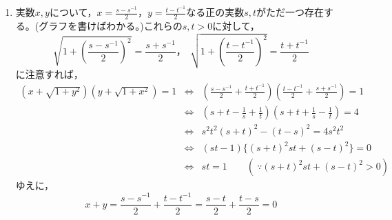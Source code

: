 \documentclass[a4paper,12pt]{jsarticle}
\newcommand{\ds}{\displaystyle}
\begin{document}
\begin{enumerate}
\item
実数$x,y$について，$\ds x = \frac{s-s^{-1}}{2}，y = \frac{t-t^{-1}}{2}なる正の実数s,t$がただ一つ存在する。(グラフを書けばわかる。)これらの$s,t>0$に対して，
  $$ \sqrt{1+\left(\frac{s-s^{-1}}{2}\right)^{2}} = \frac{s+s^{-1}}{2}，\ \ \sqrt{1+\left(\frac{t-t^{-1}}{2}\right)^{2}} = \frac{t+t^{-1}}{2}$$
に注意すれば，
\begin{eqnarray*}
  (x+\sqrt{1+y^2})(y+\sqrt{1+x^2}) = 1 &\Leftrightarrow& \left( \frac{s-s^{-1}}{2} + \frac{t+t^{-1}}{2} \right) \left( \frac{t-t^{-1}}{2} + \frac{s+s^{-1}}{2} \right) = 1 \\
  &\Leftrightarrow& \left( s+t-\frac{1}{s}+\frac{1}{t} \right) \left( s+t+\frac{1}{s}-\frac{1}{t} \right) = 4 \\
  &\Leftrightarrow& s^{2}t^{2}(s+t)^{2} - (t-s)^{2} = 4s^{2}t^{2} \\
  &\Leftrightarrow& (st-1) \bigl\{ (s+t)^{2}st + (s-t)^{2} \bigr\} = 0 \\
  &\Leftrightarrow& st = 1 \qquad (\ \because (s+t)^{2}st + (s-t)^{2}>0)
\end{eqnarray*}
ゆえに，
  $$ x+y = \frac{s-s^{-1}}{2} + \frac{t-t^{-1}}{2} = \frac{s-t}{2} + \frac{t-s}{2} = 0$$
\end{enumerate}

\end{document}
